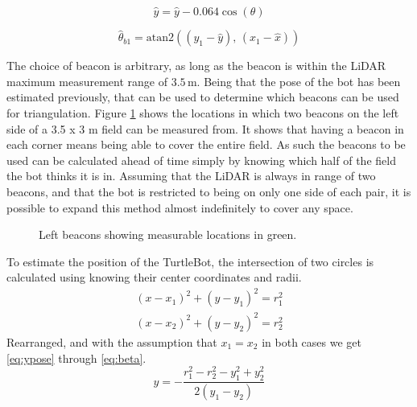 	\begin{equation}
	\label{eq:ycorr}
		\hat{y} = \hat{y} - 0.064\cos{\left(\theta\right)}
	\end{equation}
	
	\begin{equation}
	\label{eq:thetab1}
		\hat{\theta}_{b1} = \text{atan2}\left(\left(y_{1} - \hat{y}\right),\,\left(x_{1} - \hat{x}\right)\right)
	\end{equation}
	
	The choice of beacon is arbitrary, as long as the beacon is within the LiDAR maximum measurement range of $3.5\,\text{m}$. Being that the pose of the bot has been estimated previously, that can be used to determine which beacons can be used for triangulation. Figure \ref{fig:beac1} shows the locations in which two beacons on the left side of a 3.5 x 3 m field can be measured from. It shows that having a beacon in each corner means being able to cover the entire field. As such the beacons to be used can be calculated ahead of time simply by knowing which half of the field the bot thinks it is in. Assuming that the LiDAR is always in range of two beacons, and that the bot is restricted to being on only one side of each pair, it is possible to expand this method almost indefinitely to cover any space.\par
	\begin{figure}
	\centering
		\caption{Left beacons showing measurable locations in green.}
		\label{fig:beac1}
	\end{figure}
		
	
	To estimate the position of the TurtleBot, the intersection of two circles is calculated using knowing their center coordinates and radii.
	\begin{equation}
	\begin{aligned}
		\left(x-x_{1}\right)^{2} + \left(y-y_{1}\right)^{2}=r_{1}^{2}	\\
		\left(x-x_{2}\right)^{2} + \left(y-y_{2}\right)^{2}=r_{2}^{2}
	\end{aligned}
	\end{equation}
	Rearranged, and with the assumption that $x_{1}=x_{2}$  in both cases we get \ref{eq:ypose} through \ref{eq:beta}.
	\begin{equation}
	\label{eq:ypose}
		y = -\frac{r_{1}^{2}-r_{2}^{2}-y_{1}^{2}+y_{2}^{2}}{2\left(y_{1}-y_{2}\right)}
	\end{equation}
	
